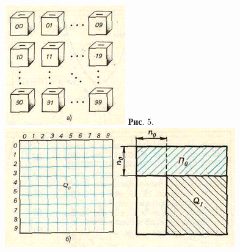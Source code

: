 \documentclass{article}
\begin{document}
\begin{figure}[ht]
  \includegraphics[width=\linewidth]{Image_1.png}
  \textbf{Рис}. 5.
\endminipage\hfill
{}
  \includegraphics[width=\linewidth]{Image_2.png}
  \captionsetup{labelformat=ris,labelsep=quad}
  \caption{}
\endminipage\hfill
\end{figure}
\end{document}
